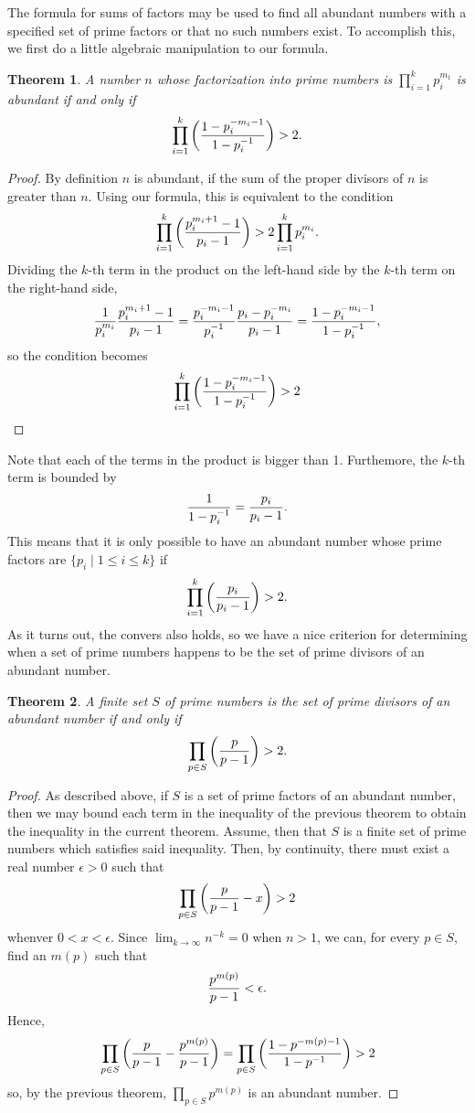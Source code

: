\documentclass[12pt]{article}
\newtheorem{thm}{Theorem}
\begin{document}
The formula for sums of factors may be used to
find all abundant numbers with a specified set
of prime factors or that no such numbers 
exist.  To accomplish this, we first do a 
little algebraic manipulation to our formula.

\begin{thm}
A number $n$ whose factorization
into prime numbers is $\prod_{i=1}^k p_i^{m_1}$
is abundant if and only if
\[
\prod_{i=1}^k
\left( {
1 - p_i^{-m_i - 1}  \over
1 - p_i^{-1}
} \right)
> 2.
\]
\end{thm}

\begin{proof}
By definition $n$ is abundant, if the sum of
the proper divisors of $n$ is greater than $n$.  
Using our formula, this is equivalent to the condition
\[
\prod_{i=1}^k
\left( {
p_i^{m_i + 1} - 1 \over p_i - 1
} \right) >
2 \prod_{i=1}^k p_i^{m_i}.
\]
Dividing the $k$-th term in the product on
the left-hand side by the $k$-th term on the
right-hand side,
\[
{1 \over p_i^{m_i}}
{p_i^{m_i + 1} - 1 \over p_i - 1} =
{p_i^{-m_i - 1} \over p_i^{-1}}
{p_i - p_i^{-m_i} \over p_i - 1} =
{1 - p_i^{-m_i - 1} \over 1 - p_i^{-1}},
\]
so the condition becomes
\[
\prod_{i=1}^k
\left( {
1 - p_i^{-m_i - 1} \over 1 - p_i^{-1}
} \right)
> 2
\]
\end{proof}

Note that each of the terms in the product is bigger than 1.
Furthemore, the $k$-th term is bounded by
\[
{1 \over 1 - p_i^{-1}} = 
{p_i \over p_i - 1}.
\]
This means that it is only possible to have an abundant
number whose prime factors are $\{p_i \mid 1 \le i \le k\}$
if
\[
\prod_{i=1}^k
\left( {p_i \over p_i - 1} \right)
> 2.
\]
As it turns out, the convers also holds, so we have a 
nice criterion for determining when a set of prime
numbers happens to be the set of prime divisors of 
an abundant number.

\begin{thm}
A finite set $S$ of prime numbers is the set of
prime divisors of an abundant number if and only if
\[
\prod_{p \in S} \left( {p \over p - 1} \right) > 2.
\]
\end{thm}

\begin{proof}
As described above, if $S$ is a set of prime factors
of an abundant number, then we may bound each term 
in the inequality of the previous theorem to obtain
the inequality in the current theorem.  Assume, then
that $S$ is a finite set of prime numbers which
satisfies said inequality.  Then, by continuity,
there must exist a real number $\epsilon > 0$ such
that
\[
\prod_{p \in S} 
\left( {p \over p - 1} - x \right) 
> 2
\]
whenver $0 < x < \epsilon$.  Since $\lim_{k \to \infty} 
n^{-k} = 0$ when $n > 1$, we can, for every $p \in S$, 
find an $m(p)$ such that
\[
{p^{m(p)} \over p - 1} < \epsilon.
\]
Hence, 
\[
\prod_{p \in S}
\left( {p \over p - 1} - 
{p^{m(p)} \over p - 1} \right) =
\prod_{p \in S}
\left( {1 - p^{-m(p)-1} \over 1 - p^{-1}} \right) > 2
\]
so, by the previous theorem, $\prod_{p \in S} p^{m(p)}$
is an abundant number.
\end{proof}


\end{document}
